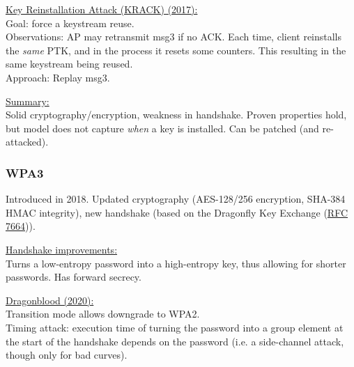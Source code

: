 \href{https://www.krackattacks.com/}{\underline{Key Reinstallation Attack (KRACK)} (2017):} \\
Goal: force a keystream reuse.
\\
Observations: AP may retransmit msg3 if no ACK. Each time, client reinstalls the \textit{same} PTK, and in the process it resets some counters.
This resulting in the same keystream being reused.
\\
Approach: Replay msg3.

\underline{Summary:}\\
Solid cryptography/encryption, weakness in handshake.
Proven properties hold, but model does not capture \textit{when} a key is installed.
Can be patched (and re-attacked).


\subsubsection*{WPA3}

Introduced in 2018.
Updated cryptography (AES-128/256 encryption, SHA-384 HMAC integrity), new handshake (based on the Dragonfly Key Exchange (\href{https://tools.ietf.org/html/rfc7664}{RFC 7664})).

\underline{Handshake improvements:}\\
Turns a low-entropy password into a high-entropy key, thus allowing for shorter passwords.
Has forward secrecy.

\href{https://wpa3.mathyvanhoef.com/}{\underline{Dragonblood} (2020):}\\
Transition mode allows downgrade to WPA2.
\\
Timing attack: execution time of turning the password into a group element at the start of the handshake depends on the password (i.e. a side-channel attack, though only for bad curves).


